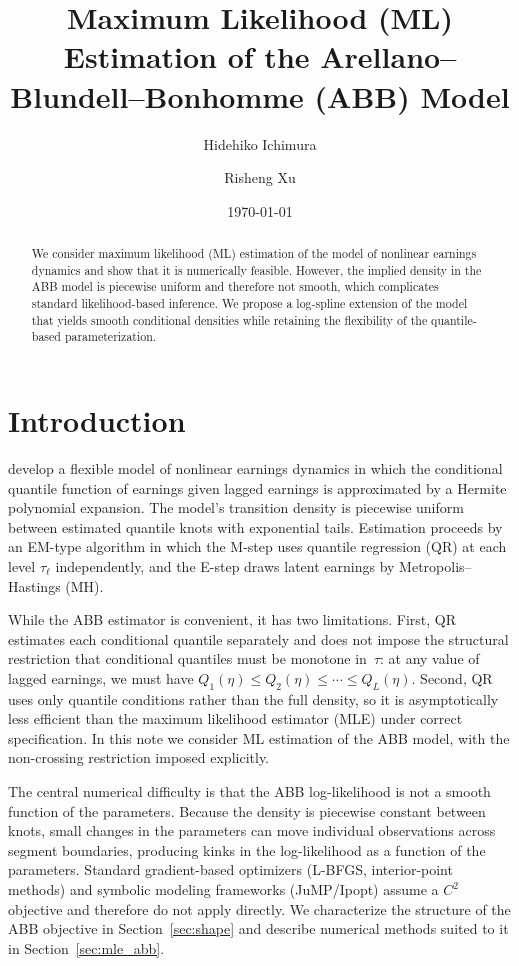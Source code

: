 \documentclass[12pt]{article}
\title{Maximum Likelihood (ML) Estimation of the Arellano--Blundell--Bonhomme (ABB) Model}
\author{Hidehiko Ichimura \and Risheng Xu}
\date{\today}
\begin{document}
\maketitle

\begin{abstract}
We consider maximum likelihood (ML) estimation of the \citet{abb2017} model of nonlinear earnings dynamics and show that it is numerically feasible.
However, the implied density in the ABB model is piecewise uniform and therefore not smooth, which complicates standard likelihood-based inference.
We propose a log-spline extension of the model that yields smooth conditional densities while retaining the flexibility of the quantile-based parameterization.
\end{abstract}

\section{Introduction}

\citet{abb2017} develop a flexible model of nonlinear earnings dynamics in which the conditional quantile function of earnings given lagged earnings is approximated by a Hermite polynomial expansion. The model's transition density is piecewise uniform between estimated quantile knots with exponential tails. Estimation proceeds by an EM-type algorithm in which the M-step uses quantile regression (QR) at each level $\tau_{\ell}$ independently, and the E-step draws latent earnings by Metropolis--Hastings (MH).

While the ABB estimator is convenient, it has two limitations. First, QR estimates each conditional quantile separately and does not impose the structural restriction that conditional quantiles must be monotone in~$\tau$: at any value of lagged earnings, we must have $Q_{1}(\eta) \leq Q_{2}(\eta) \leq \cdots \leq Q_{L}(\eta)$. Second, QR uses only quantile conditions rather than the full density, so it is asymptotically less efficient than the maximum likelihood estimator (MLE) under correct specification. In this note we consider ML estimation of the ABB model, with the non-crossing restriction imposed explicitly.

The central numerical difficulty is that the ABB log-likelihood is not a smooth function of the parameters. Because the density is piecewise constant between knots, small changes in the parameters can move individual observations across segment boundaries, producing kinks in the log-likelihood as a function of the parameters. Standard gradient-based optimizers (L-BFGS, interior-point methods) and symbolic modeling frameworks (JuMP/Ipopt) assume a $C^{2}$ objective and therefore do not apply directly. We characterize the structure of the ABB objective in Section~\ref{sec:shape} and describe numerical methods suited to it in Section~\ref{sec:mle_abb}.
\end{document}
